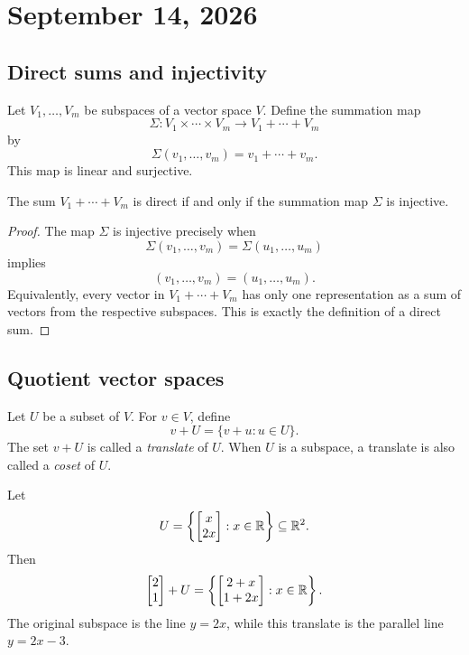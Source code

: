 \section{September 14, 2026}

\subsection{Direct sums and injectivity}

Let $V_1,\ldots,V_m$ be subspaces of a vector space $V$. Define the
summation map
\[
  \Sigma\colon V_1\times\cdots\times V_m
  \longrightarrow V_1+\cdots+V_m
\]
by
\[
  \Sigma(v_1,\ldots,v_m)=v_1+\cdots+v_m.
\]
This map is linear and surjective.

\begin{proposition}
  The sum $V_1+\cdots+V_m$ is direct if and only if the summation map
  $\Sigma$ is injective.
\end{proposition}

\begin{proof}
  The map $\Sigma$ is injective precisely when
  \[
    \Sigma(v_1,\ldots,v_m)=\Sigma(u_1,\ldots,u_m)
  \]
  implies
  \[
    (v_1,\ldots,v_m)=(u_1,\ldots,u_m).
  \]
  Equivalently, every vector in $V_1+\cdots+V_m$ has only one
  representation as a sum of vectors from the respective subspaces.
  This is exactly the definition of a direct sum.
\end{proof}

\subsection{Quotient vector spaces}

Let $U$ be a subset of $V$. For $v\in V$, define
\[
  v+U=\{v+u:u\in U\}.
\]
The set $v+U$ is called a \emph{translate} of $U$. When $U$ is a
subspace, a translate is also called a \emph{coset} of $U$.

\begin{example}
  Let
  \[
    U=\left\{\begin{bmatrix}x\\2x\end{bmatrix}:x\in\mathbb{R}\right\}
    \subseteq\mathbb{R}^2.
  \]
  Then
  \[
    \begin{bmatrix}2\\1\end{bmatrix}+U
    =\left\{\begin{bmatrix}2+x\\1+2x\end{bmatrix}:x\in\mathbb{R}\right\}.
  \]
  The original subspace is the line $y=2x$, while this translate is the
  parallel line $y=2x-3$.
\end{example}

